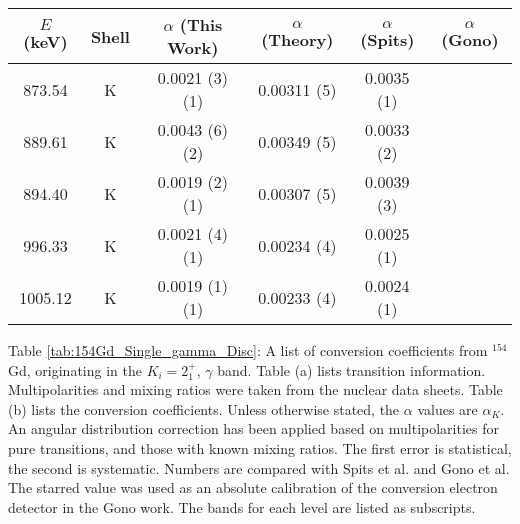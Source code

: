 \begin{table}
    \ContinuedFloat
    \begin{subtable}{\textwidth}
    \end{subtable}
    \begin{ThreePartTable}
    \begin{subtable}{\textwidth}
        \caption{}
        \begin{tabular}{c|c|c|c|c|c}
            \toprule
            $E$ (keV) & Shell &	$\alpha$ (This Work)	&	$\alpha$  (Theory)\citep{kibedi08:_BRICC}	&	$\alpha$ (Spits)\citep{spits96:_154gd} & $\alpha$ (Gono)\citep{gono74:_154gd_e0} \\
            \hline
            873.54	& K &	0.0021	(3)	(1) &	0.00311 (5)	&	0.0035 (1)	\\
            \hline
            889.61	& K &	0.0043	(6) (2)	&	0.00349 (5)	&	0.0033 (2)	\\
            \hline
            894.40	& K &	0.0019	(2) (1)	&	0.00307 (5)	&	0.0039 (3)	\\
            \hline
            996.33	& K &	0.0021	(4) (1)	&	0.00234 (4)	&	0.0025 (1)	\\
            \hline
            1005.12	& K &	0.0019	(1) (1)	&	0.00233 (4)	&	0.0024 (1)	\\
            \bottomrule
        \end{tabular}
        \end{subtable}

        \makeatletter\def\TPT@hsize{}\makeatletter
        
        \begin{tablenotes}[para]
            Table \ref{tab:154Gd_Single_gamma_Disc}: A list of conversion coefficients from $^{154}$Gd, originating in the $K_i=2^+_1$, $\gamma$ band. Table (a) lists transition information. Multipolarities and mixing ratios were taken from the nuclear data sheets\citep{reich09:_nds_154}. Table (b) lists the conversion coefficients. Unless otherwise stated, the $\alpha$ values are $\alpha_K$. An angular distribution correction has been applied based on multipolarities for pure transitions, and those with known mixing ratios. The first error is statistical, the second is systematic. Numbers are compared with Spits et al.\citep{spits96:_154gd} and Gono et al.\citep{gono74:_154gd_e0} The starred value was used as an absolute calibration of the conversion electron detector in the Gono work. The bands for each level are listed as subscripts.
        \end{tablenotes}
\end{ThreePartTable}
\end{table}
